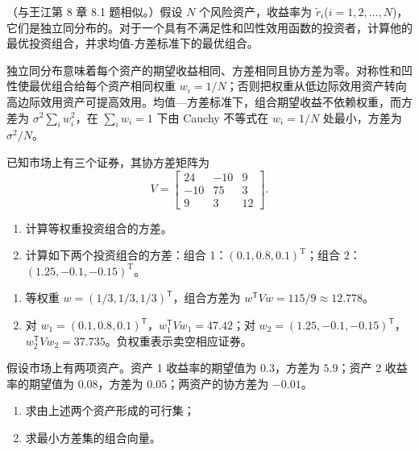 \begin{problem}
（与王江第 8 章 8.1 题相似。）假设 $N$ 个风险资产，收益率为 $\tilde{r}_i$($i=1,2,\ldots,N$)，它们是独立同分布的。对于一个具有不满足性和凹性效用函数的投资者，计算他的最优投资组合，并求均值-方差标准下的最优组合。
\end{problem}
\begin{solution}
独立同分布意味着每个资产的期望收益相同、方差相同且协方差为零。对称性和凹性使最优组合给每个资产相同权重 $w_i=1/N$；否则把权重从低边际效用资产转向高边际效用资产可提高效用。均值—方差标准下，组合期望收益不依赖权重，而方差为 $\sigma^2\sum_iw_i^2$，在 $\sum_iw_i=1$ 下由 Cauchy 不等式在 $w_i=1/N$ 处最小，方差为 $\sigma^2/N$。
\end{solution}
\begin{problem}
 已知市场上有三个证券，其协方差矩阵为
\[
    V=\begin{bmatrix}
        24 & -10 & 9\\
        -10 & 75 & 3\\
        9 & 3 & 12
    \end{bmatrix}.
\]
\begin{enumerate}[label=(\alph*)]
    \item 计算等权重投资组合的方差。
    \item 计算如下两个投资组合的方差：组合 1：$(0.1,0.8,0.1)^{\mathrm{T}}$；组合 2：$(1.25,-0.1,-0.15)^{\mathrm{T}}$。
\end{enumerate}
\end{problem}
\begin{solution}
\begin{enumerate}[label=(\alph*)]
\item 等权重 $w=(1/3,1/3,1/3)^{\mathsf T}$，组合方差为 $w^{\mathsf T}Vw=115/9\approx12.778$。
\item 对 $w_1=(0.1,0.8,0.1)^{\mathsf T}$，$w_1^{\mathsf T}Vw_1=47.42$；对 $w_2=(1.25,-0.1,-0.15)^{\mathsf T}$，$w_2^{\mathsf T}Vw_2=37.735$。负权重表示卖空相应证券。
\end{enumerate}
\end{solution}
\begin{problem}
 假设市场上有两项资产。资产 1 收益率的期望值为 $0.3$，方差为 $5.9$；资产 2 收益率的期望值为 $0.08$，方差为 $0.05$；两资产的协方差为 $-0.01$。
\begin{enumerate}[label=(\alph*)]
    \item 求由上述两个资产形成的可行集；
    \item 求最小方差集的组合向量。
\end{enumerate}
\end{problem}
